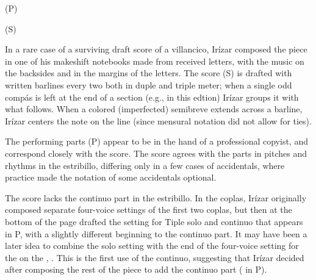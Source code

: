 
\begin{notesources}

\item (P)

\item (S)

\end{notesources}

In a rare case of a surviving draft score of a villancico, Irízar composed the piece in one of his makeshift notebooks made from received letters, with the music on the backsides and in the margins of the letters.
The score (S) is drafted with written barlines every two  both in duple and triple meter; when a single odd compás is left at the end of a section (e.g.,  in this edtion) Irízar groups it with what follows.
When a colored (imperfected) semibreve extends across a barline, Irízar centers the note on the line (since mensural notation did not allow for ties).

The performing parts (P) appear to be in the hand of a professional copyist, and correspond closely with the score.
The score agrees with the parts in pitches and rhythms in the estribillo, differing only in a few cases of accidentals, where  practice made the notation of some accidentals optional.

The score lacks the  continuo part in the estribillo.
In the coplas, Irízar originally composed separate four-voice settings of the first two coplas, but then at the bottom of the page drafted the setting for Tiple solo and continuo that appears in P, with a slightly different beginning to the continuo part.
It may have been a later idea to combine the solo setting with the end of the four-voice setting for the  on the , .
This is the first use of the continuo, suggesting that Irízar decided after composing the rest of the piece to add the continuo part ( in P).

